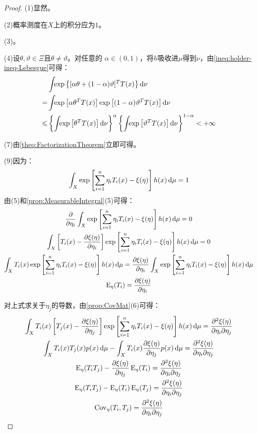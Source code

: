 \begin{proof}
	(1)显然。\par
	(2)概率测度在$X$上的积分应为$1$。\par
	(3)。\par
	(4)设$\theta,\vartheta\in\Xi$且$\theta\ne\vartheta$。对任意的 $\alpha\in(0,1)$，将$h$吸收进$\mu$得到$\nu$，由\cref{ineq:holder-ineq-Lebesgue}可得：
	\begin{align*}
		&\int_{}\exp\left\{[\alpha\theta+(1-\alpha)\vartheta]^TT(x)\right\}\mathop{}\!\mathrm{d}\nu \\
		=&\int_{}\exp\left[\alpha\theta^TT(x)\right]\exp\left[(1-\alpha)\vartheta^TT(x)\right]\mathop{}\!\mathrm{d}\nu \\
		\leqslant&\left\{\int_{}\exp\left[\theta^TT(x)\right]\mathop{}\!\mathrm{d}\nu\right\}^{\alpha}\left\{\int_{}\exp\left[\vartheta^TT(x)\right]\mathop{}\!\mathrm{d}\nu\right\}^{1-\alpha}<+\infty
	\end{align*}\par
	(7)由\cref{theo:FactorizationTheorem}立即可得。\par
	(9)因为：
	\begin{equation*}
		\int_{X}\exp\left[\sum_{i=1}^{n}\eta_iT_i(x)-\xi(\eta)\right]h(x)\mathop{}\!\mathrm{d}\mu=1
	\end{equation*}
	由(5)和\cref{prop:MeasurableIntegral}(5)可得：
	\begin{gather*}
		\frac{\partial}{\partial\eta_i}\int_{X}^{}\exp\left[\sum_{i=1}^{n}\eta_iT_i(x)-\xi(\eta)\right]h(x)\mathop{}\!\mathrm{d}\mu=0 \\
		\int_{X}^{}\left[T_i(x)-\frac{\partial \xi(\eta)}{\partial\eta_i}\right]\exp\left[\sum_{i=1}^{n}\eta_iT_i(x)-\xi(\eta)\right]h(x)\mathop{}\!\mathrm{d}\mu=0 \\
		\int_{X}^{}T_i(x)\exp\left[\sum_{i=1}^{n}\eta_iT_i(x)-\xi(\eta)\right]h(x)\mathop{}\!\mathrm{d}\mu=\frac{\partial \xi(\eta)}{\partial\eta_i}\int_{X}^{}\exp\left[\sum_{i=1}^{n}\eta_iT_i(x)-\xi(\eta)\right]h(x)\mathop{}\!\mathrm{d}\mu \\
		\operatorname{E}_{\eta}(T_i)=\frac{\partial \xi(\eta)}{\partial\eta_i}
	\end{gather*}\par
	对上式求关于$\eta_j$的导数，由\cref{prop:CovMat}(6)可得：
	\begin{gather*}
		\int_{X}^{}T_i(x)\left[T_j(x)-\frac{\partial \xi(\eta)}{\partial\eta_j}\right]\exp\left[\sum_{i=1}^{n}\eta_iT_i(x)-\xi(\eta)\right]h(x)\mathop{}\!\mathrm{d}\mu=\frac{\partial^2 \xi(\eta)}{\partial\eta_i\partial\eta_j} \\
		\int_{X}^{}T_i(x)T_j(x)p(x)\mathop{}\!\mathrm{d}\mu-\int_{X}^{}T_i(x)\frac{\partial \xi(\eta)}{\partial\eta_j}p(x)\mathop{}\!\mathrm{d}\mu=\frac{\partial^2 \xi(\eta)}{\partial\eta_i\partial\eta_j} \\
		\operatorname{E}_{\eta}(T_iT_j)-\frac{\partial \xi(\eta)}{\partial\eta_j}\operatorname{E}_{\eta}(T_i)=\frac{\partial^2 \xi(\eta)}{\partial\eta_i\partial\eta_j} \\
		\operatorname{E}_{\eta}(T_iT_j)-\operatorname{E}_{\eta}(T_i)\operatorname{E}_{\eta}(T_j)=\frac{\partial^2 \xi(\eta)}{\partial\eta_i\partial\eta_j} \\
		\operatorname{Cov}_{\eta}(T_i,T_j)=\frac{\partial^2 \xi(\eta)}{\partial\eta_i\partial\eta_j}\qedhere
	\end{gather*}
\end{proof}
